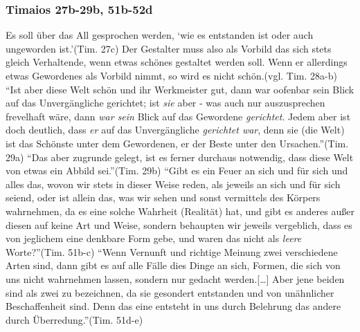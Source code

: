 \subsubsection*{Timaios 27b-29b, 51b-52d}
Es soll über das All gesprochen werden, \enquote*{wie es entstanden ist oder auch ungeworden ist.}(Tim. 27c)\nocite{TimaiosSchleiermacher}
Der Gestalter muss also als Vorbild das sich stets gleich Verhaltende, wenn etwas schönes gestaltet werden soll. Wenn er allerdings etwas Gewordenes als Vorbild nimmt, so wird es nicht schön.(vgl. Tim. 28a-b)
\enquote{Ist aber diese Welt schön und ihr Werkmeister gut, dann war oofenbar sein Blick auf das Unvergängliche gerichtet; ist \emph{sie} aber - was auch nur auszusprechen frevelhaft wäre, dann \emph{war sein} Blick auf das Gewordene \emph{gerichtet}. Jedem aber ist doch deutlich, dass \emph{er} auf das Unvergängliche \emph{gerichtet war}, denn sie (die Welt) ist das Schönste unter dem Gewordenen, er der Beste unter den Ursachen.}(Tim. 29a)
\enquote{Das aber zugrunde gelegt, ist es ferner durchaus notwendig, dass diese Welt von etwas ein Abbild sei.}(Tim. 29b)
\enquote{Gibt es ein Feuer an sich und für sich und alles das, wovon wir stets in dieser Weise reden, als jeweils an sich und für sich seiend, oder ist allein das, was wir sehen und sonst vermittels des Körpers wahrnehmen, da es eine solche Wahrheit (Realität) hat, und gibt es anderes außer diesen auf keine Art und Weise, sondern behaupten wir jeweils vergeblich, dass es von jeglichem eine denkbare Form gebe, und waren das nicht als \emph{leere} Worte?}(Tim. 51b-c)
\enquote{Wenn Vernunft und richtige Meinung zwei verschiedene Arten sind, dann gibt es auf alle Fälle dies Dinge an sich, Formen, die sich von uns nicht wahrnehmen lassen, sondern nur gedacht werden.[\dots] Aber jene beiden sind als zwei zu bezeichnen, da sie gesondert entstanden und von unähnlicher Beschaffenheit sind. Denn das eine entsteht in uns durch Belehrung das andere durch Überredung.}(Tim. 51d-e)
